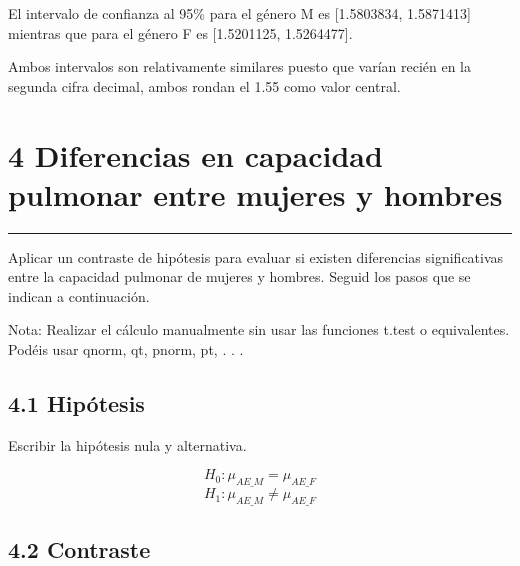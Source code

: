 \documentclass[
]{article}
\begin{document}
\vspace{0.3cm}

El intervalo de confianza al 95\% para el género M es {[}1.5803834,
1.5871413{]} mientras que para el género F es {[}1.5201125,
1.5264477{]}.

\vspace{0.3cm}

Ambos intervalos son relativamente similares puesto que varían recién en
la segunda cifra decimal, ambos rondan el 1.55 como valor central.

\newpage

\hypertarget{diferencias-en-capacidad-pulmonar-entre-mujeres-y-hombres}{%
\section{4 Diferencias en capacidad pulmonar entre mujeres y
hombres}\label{diferencias-en-capacidad-pulmonar-entre-mujeres-y-hombres}}

\begin{center}\rule{0.5\linewidth}{0.5pt}\end{center}

\vspace{0.3cm}

Aplicar un contraste de hipótesis para evaluar si existen diferencias
significativas entre la capacidad pulmonar de mujeres y hombres. Seguid
los pasos que se indican a continuación.

Nota: Realizar el cálculo manualmente sin usar las funciones t.test o
equivalentes. Podéis usar qnorm, qt, pnorm, pt, . . .

\vspace{0.3cm}

\hypertarget{hipuxf3tesis}{%
\subsection{4.1 Hipótesis}\label{hipuxf3tesis}}

Escribir la hipótesis nula y alternativa.

\vspace{0.3cm}

\[H_0:  \mu_{AE\_M} = \mu_{AE\_F}\]
\[H_1: \mu_{AE\_M} \neq \mu_{AE\_F}\]

\vspace{0.3cm}

\hypertarget{contraste}{%
\subsection{4.2 Contraste}\label{contraste}}
\end{document}
